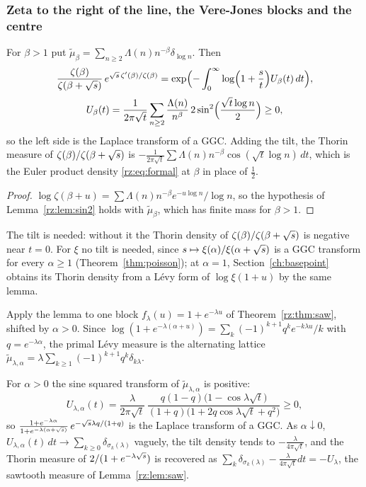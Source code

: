 \subsubsection{Zeta to the right of the line, the Vere-Jones blocks and the centre}

\begin{proposition}\label{rz:prop:zetaright}
For $\beta>1$ put $\tilde\mu_\beta=\sum_{n\ge2}\Lambda(n)n^{-\beta}\delta_{\log n}$. Then
\[
\frac{\zeta(\beta)}{\zeta(\beta+\sqrt{s})}\,e^{\sqrt{s}\,\zeta'(\beta)/\zeta(\beta)}
=\exp\Bigl(-\int_0^\infty\log\Bigl(1+\frac st\Bigr)U_\beta(t)\,dt\Bigr),
\]
\[
U_\beta(t)=\frac{1}{2\pi\sqrt t}\sum_{n\ge2}\frac{\Lambda(n)}{n^\beta}\,2\sin^2\Bigl(\frac{\sqrt t\log n}2\Bigr)\ge0,
\]
so the left side is the Laplace transform of a GGC. Adding the tilt, the Thorin measure of $\zeta(\beta)/\zeta(\beta+\sqrt{s})$ is $-\frac{1}{2\pi\sqrt t}\sum\Lambda(n)n^{-\beta}\cos(\sqrt t\log n)\,dt$, which is the Euler product density \eqref{rz:eq:formal} at $\beta$ in place of $\frac12$.
\end{proposition}

\begin{proof}
$\log\zeta(\beta+u)=\sum\Lambda(n)n^{-\beta}e^{-u\log n}/\log n$, so the hypothesis of Lemma~\ref{rz:lem:sin2} holds with $\tilde\mu_\beta$, which has finite mass for $\beta>1$.
\end{proof}

The tilt is needed: without it the Thorin density of $\zeta(\beta)/\zeta(\beta+\sqrt{s})$ is negative near $t=0$. For $\xi$ no tilt is needed, since $s\mapsto\xi(\alpha)/\xi(\alpha+\sqrt{s})$ is a GGC transform for every $\alpha\ge1$ (Theorem~\ref{thm:poisson}); at $\alpha=1$, Section~\ref{ch:basepoint} obtains its Thorin density from a L\'evy form of $\log\xi(1+u)$ by the same lemma.

Apply the lemma to one block $f_\lambda(u)=1+e^{-\lambda u}$ of Theorem~\ref{rz:thm:saw}, shifted by $\alpha>0$. Since $\log(1+e^{-\lambda(\alpha+u)})=\sum_k(-1)^{k+1}q^ke^{-k\lambda u}/k$ with $q=e^{-\lambda\alpha}$, the primal L\'evy measure is the alternating lattice $\tilde\mu_{\lambda,\alpha}=\lambda\sum_{k\ge1}(-1)^{k+1}q^k\delta_{k\lambda}$.

\begin{proposition}\label{rz:prop:block}
For $\alpha>0$ the sine squared transform of $\tilde\mu_{\lambda,\alpha}$ is positive:
\[
U_{\lambda,\alpha}(t)=\frac{\lambda}{2\pi\sqrt t}\,\frac{q(1-q)\bigl(1-\cos\lambda\sqrt t\bigr)}{(1+q)\bigl(1+2q\cos\lambda\sqrt t+q^2\bigr)}\ge0,
\]
so $\frac{1+e^{-\lambda\alpha}}{1+e^{-\lambda(\alpha+\sqrt{s})}}\,e^{-\sqrt{s}\lambda q/(1+q)}$ is the Laplace transform of a GGC. As $\alpha\downarrow0$, $U_{\lambda,\alpha}(t)\,dt\to\sum_{k\ge0}\delta_{\sigma_k(\lambda)}$ vaguely, the tilt density tends to $-\frac{\lambda}{4\pi\sqrt t}$, and the Thorin measure of $2/(1+e^{-\lambda\sqrt{s}})$ is recovered as $\sum_k\delta_{\sigma_k(\lambda)}-\frac{\lambda}{4\pi\sqrt t}dt=-U_\lambda$, the sawtooth measure of Lemma~\ref{rz:lem:saw}.
\end{proposition}

